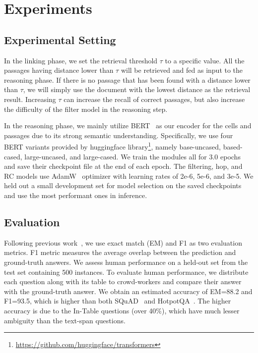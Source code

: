 \documentclass[11pt,a4paper]{article}
\begin{document}
\section{Experiments}
\subsection{Experimental Setting}
In the linking phase, we set the retrieval threshold $\tau$ to a specific value. All the passages having distance lower than $\tau$ will be retrieved and fed as input to the reasoning phase. If there is no passage that has been found with a distance lower than $\tau$, we will simply use the document with the lowest distance as the retrieval result. Increasing $\tau$ can increase the recall of correct passages, but also increase the difficulty of the filter model in the reasoning step. 

In the reasoning phase, we mainly utilize BERT~\cite{devlin2019bert} as our encoder for the cells and passages due to its strong semantic understanding. Specifically, we use four BERT variants provided by huggingface library\footnote{\url{https://github.com/huggingface/transformers}}, namely base-uncased, based-cased, large-uncased, and large-cased. We train the modules all for 3.0 epochs and save their checkpoint file at the end of each epoch. The filtering, hop, and RC models use AdamW~\cite{loshchilov2017decoupled} optimizer with learning rates of 2e-6, 5e-6, and 3e-5. We held out a small development set for model selection on the saved checkpoints and use the most performant ones in inference.

\subsection{Evaluation}
Following previous work~\cite{rajpurkar2016squad}, we use exact match (EM) and F1 as two evaluation metrics. F1 metric measures the average overlap between the prediction and ground-truth answers. We assess human performance on a held-out set from the test set containing 500 instances. To evaluate human performance, we distribute each question along with its table to crowd-workers and compare their answer with the ground-truth answer. We obtain an estimated accuracy of EM=88.2 and F1=93.5, which is higher than both SQuAD~\cite{rajpurkar2016squad} and HotpotQA~\cite{yang2018hotpotqa}. The higher accuracy is due to the In-Table questions (over 40\%), which have much lesser ambiguity than the text-span questions. 
\end{document}
